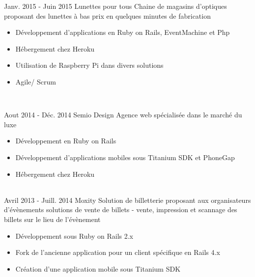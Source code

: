 \documentclass[letterpaper]{twentysecondcv} %
\begin{document}
\begin{twenty}

    \twentyitem
   		{Janv. 2015 - }
		{Juin 2015}
        {Lunettes pour tous}
        {}
        {Chaine de magasins d'optiques proposant des lunettes à bas prix en quelques minutes de fabrication}
        {
        {\begin{itemize}
        \item Développement d'applications en Ruby on Rails, EventMachine et Php
        \item Hébergement chez Heroku
        \item Utilisation de Raspberry Pi dans divers solutions
        \item Agile/ Scrum


    \end{itemize}}
        }
     \\

\end{twenty}

\begin{twenty}

     \twentyitem
   		{Aout 2014 - }
		{Déc. 2014}
        {Semio Design}
        {}
        {Agence web spécialisée dans le marché du luxe}
        {
        \begin{itemize}
        \item Développement en Ruby on Rails
        \item Développement d'applications mobiles sous Titanium SDK et PhoneGap
        \item Hébergement chez Heroku
    \end{itemize}
    	}

\end{twenty}

\begin{twenty}

     \\   
    \twentyitem
   		{Avril 2013 - }
		{Juill. 2014}
        {Moxity}
        {}
        {Solution de billetterie proposant aux organisateurs d'évènements solutions de vente de billets - vente, impression et scannage des billets sur le lieu de l'évènement}
        {
        {\begin{itemize}
        \item Développement sous Ruby on Rails 2.x
        \item Fork de l'ancienne application pour un client spécifique en Rails 4.x
        \item Création d'une application mobile sous Titanium SDK


    \end{itemize}}
        }

\end{twenty}
\end{document}
